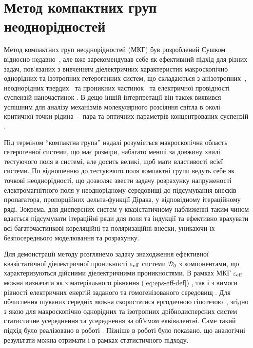 \documentclass[14pt,twoside]{vakthesis}
\begin{document}
\section{Метод компактних груп неоднорідностей}\label{sec:CGA}

Метод компактних груп неоднорідностей (МКГ) був розроблений Сушком відносно недавно~\cite{Sushko2004, Sushko2007, SushkoJPD2009, Sushko2017}, але вже зарекомендував себе як ефективний підхід для різних задач, пов'язаних з вивченням діелектричних характеристик макроскопічно однорідних та ізотропних гетерогенних систем, що складаються з анізотропних~\cite{SushkoJPD2009}, неоднорідних твердих~\cite{Sushko2017} та  проникних частинок~\cite{Sushko2018EPJ} та електричної провідності суспензій наночастинок \cite{Sushko2016}. В дещо іншій інтерпретації він також виявився успішним  для аналізу механізмів молекулярного розсіяння світла в околі критичної точки рідина~-~пара \cite{Sushko2004, SushkoFNT2007, SushkoCMP2013} та оптичних параметрів концентрованих суспензій \cite{SushkoJPS2009}.

Під терміном ``компактна група'' надалі розуміється макроскопічна область гетерогенної системи, що має розміри, набагато менші за довжину хвилі тестуючого поля в системі, але досить великі, щоб мати властивості всієї системи. По відношенню до тестуючого поля компактні групи ведуть себе як точкові неоднорідності, що дозволяє звести задачу розрахунку напруженості електромагнітного поля у неоднорідному середовищі до підсумування внесків пропагатора, пропорційних дельта-функції Дірака, у відповідному  ітераційному ряді. Зокрема, для дисперсних систем у квазістатичному наближенні таким чином вдається підсумувати ітераційні ряди для поля та індукції   та ефективно врахувати всі багаточастинкові кореляційні та поляризаційні внески, уникаючи їх безпосереднього моделювання та  розрахунку. 

Для демонстрації методу розглянемо задачу знаходження  ефективної квазістатичної діелектричної проникності $\varepsilon_{\rm eff}$ системи ${\cal D}_0$ з компонентами, що характеризуються дійсними діелектричними проникностями.
В рамках МКГ $\varepsilon_{\rm eff}$ можна визначати як з матеріального рівняння (\ref{eq:eps-eff-def}) \cite{Sushko2007}, так і з вимоги рівності електричних енергій заданого та гомогенізованого середовищ \cite{Sushko2017}. Для обчислення шуканих середніх можна  скористатися ергодичною гіпотезою~\cite{Torquato,LandauT8}, згідно з якою для макроскопічно однорідних та ізотропних дрібнодисперсних систем статистичне усереднення та усереднення за об'ємом еквівалентні. Саме такий підхід було реалізовано в роботі \cite{Sushko2007}. Пізніше в роботі \cite{Sushko2017} було показано, що аналогічні результати можна отримати і в рамках статистичного підходу.
\end{document}
